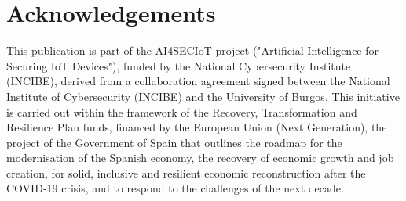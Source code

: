 \documentclass[runningheads]{llncs}
\begin{document}
\section*{Acknowledgements}
This publication is part of the AI4SECIoT project ("Artificial Intelligence for Securing IoT Devices"), funded by the National Cybersecurity Institute (INCIBE), derived from a collaboration agreement signed between the National Institute of Cybersecurity (INCIBE) and the University of Burgos. This initiative is carried out within the framework of the Recovery, Transformation and Resilience Plan funds, financed by the European Union (Next Generation), the project of the Government of Spain that outlines the roadmap for the modernisation of the Spanish economy, the recovery of economic growth and job creation, for solid, inclusive and resilient economic reconstruction after the COVID‑19 crisis, and to respond to the challenges of the next decade.




\end{document}
